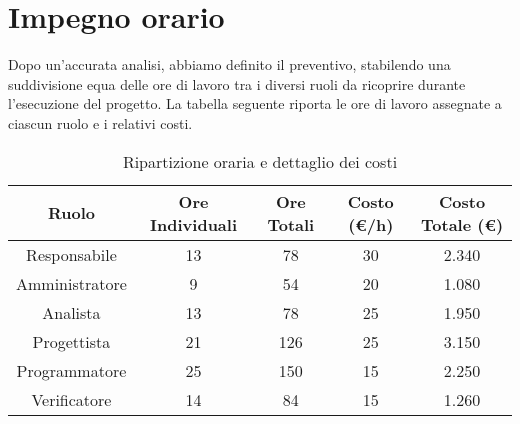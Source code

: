 \section{Impegno orario}

Dopo un'accurata analisi, abbiamo definito il preventivo, stabilendo una suddivisione equa delle ore di lavoro tra i diversi ruoli da ricoprire durante l’esecuzione del progetto.
La tabella seguente riporta le ore di lavoro assegnate a ciascun ruolo e i relativi costi.

\vspace{0.5cm}

\begin{table}[h]
    \centering
    \begin{tabular}{|c|c|c|c|c|}
        \hline
        \rowcolor[gray]{0.9}
        \textbf{Ruolo} & \textbf{Ore Individuali} & \textbf{Ore Totali} & \textbf{Costo (\euro/h)} & \textbf{Costo Totale (\euro)} \\
        \hline
        Responsabile & 13 & 78 & 30 & 2.340 \\
        \hline
        Amministratore & 9 & 54 & 20 & 1.080 \\
        \hline
        Analista & 13 & 78 & 25 & 1.950 \\
        \hline
        Progettista & 21 & 126 & 25 & 3.150 \\
        \hline
        Programmatore & 25 & 150 & 15 & 2.250 \\
        \hline
        Verificatore & 14 & 84 & 15 & 1.260 \\
        \hline
    \end{tabular}
\caption{Ripartizione oraria e dettaglio dei costi}
\end{table}
